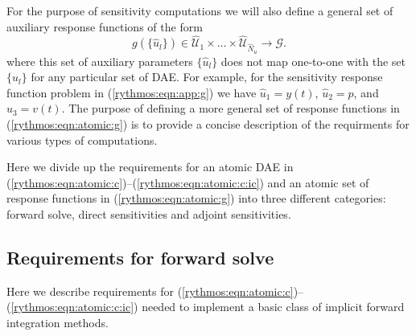 \documentclass[pdf,ps2pdf,11pt]{SANDreport}
\begin{document}
For the purpose of sensitivity computations we will also define a general
set of auxiliary response functions of the form
%
\begin{equation}
g(\{\hat{u}_l\}) \in \hat{\mathcal{U}}_1 \times \ldots \times \hat{\mathcal{U}}_{\hat{N}_u} \rightarrow \mathcal{G}.
\label{rythmos:eqn:atomic:g}
\end{equation}
%
where this set of auxiliary parameters $\{\hat{u}_l\}$ does not map one-to-one
with the set $\{u_l\}$ for any particular set of DAE.  For example, for the
sensitivity response function problem in (\ref{rythmos:eqn:app:g}) we have
$\hat{u}_1 = y(t)$, $\hat{u}_2 = p$, and $\hat{u}_3 = v(t)$.  The purpose of
defining a more general set of response functions in
(\ref{rythmos:eqn:atomic:g}) is to provide a concise description of the
requirments for various types of computations.

Here we divide up the requirements for an atomic DAE in
(\ref{rythmos:eqn:atomic:c})--(\ref{rythmos:eqn:atomic:c:ic}) and an atomic
set of response functions in (\ref{rythmos:eqn:atomic:g}) into three different
categories: forward solve, direct sensitivities and adjoint sensitivities.

\subsection{Requirements for forward solve}

Here we describe requirements for
(\ref{rythmos:eqn:atomic:c})--(\ref{rythmos:eqn:atomic:c:ic}) needed to
implement a basic class of implicit forward integration methods.
\end{document}
